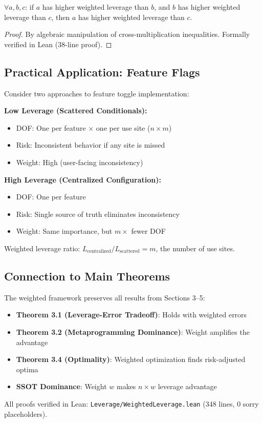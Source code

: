 \begin{theorem}
$\forall a, b, c$: if $a$ has higher weighted leverage than $b$, and $b$ has higher weighted leverage than $c$, then $a$ has higher weighted leverage than $c$.
\end{theorem}

\begin{proof}
By algebraic manipulation of cross-multiplication inequalities. Formally verified in Lean (38-line proof).
\end{proof}

\subsection{Practical Application: Feature Flags}

Consider two approaches to feature toggle implementation:

\textbf{Low Leverage (Scattered Conditionals):}
\begin{itemize}
\item DOF: One per feature $\times$ one per use site ($n \times m$)
\item Risk: Inconsistent behavior if any site is missed
\item Weight: High (user-facing inconsistency)
\end{itemize}

\textbf{High Leverage (Centralized Configuration):}
\begin{itemize}
\item DOF: One per feature
\item Risk: Single source of truth eliminates inconsistency
\item Weight: Same importance, but $m\times$ fewer DOF
\end{itemize}

Weighted leverage ratio: $L_{\text{centralized}} / L_{\text{scattered}} = m$, the number of use sites.

\subsection{Connection to Main Theorems}

The weighted framework preserves all results from Sections 3--5:

\begin{itemize}
\item \textbf{Theorem 3.1 (Leverage-Error Tradeoff)}: Holds with weighted errors
\item \textbf{Theorem 3.2 (Metaprogramming Dominance)}: Weight amplifies the advantage
\item \textbf{Theorem 3.4 (Optimality)}: Weighted optimization finds risk-adjusted optima
\item \textbf{SSOT Dominance}: Weight $w$ makes $n \times w$ leverage advantage
\end{itemize}

All proofs verified in Lean: \texttt{Leverage/WeightedLeverage.lean} (348 lines, 0 sorry placeholders).
